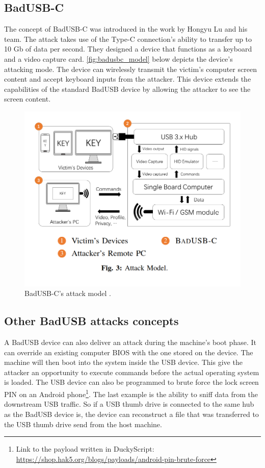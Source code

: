 \subsection*{BadUSB-C}
The concept of BadUSB-C was introduced in the work by Hongyu Lu and his team\cite{badusbc}. The attack takes use of the Type-C connection's ability to transfer up to 10 Gb of data per second. They designed a device that functions as a keyboard and a video capture card. \autoref{fig:badusbc_model} below depicts the device's attacking mode. The device can wirelessly transmit the victim's computer screen content and accept keyboard inputs from the attacker. This device extends the capabilities of the standard BadUSB device by allowing the attacker to see the screen content.
\begin{figure}[ht]
    \centering
    \includegraphics[width=0.7\linewidth]{obrazky-figures/badusbc_attack.png}
    \caption{BadUSB-C's attack model \cite{badusbc}.}
    \label{fig:badusbc_model}
\end{figure}

\subsection*{Other BadUSB attacks concepts}
A BadUSB device can also deliver an attack during the machine's boot phase. It can override an existing computer BIOS with the one stored on the device. The machine will then boot into the system inside the USB device. This give the attacker an opportunity to execute commands before the actual operating system is loaded. The USB device can also be programmed to brute force the lock screen PIN on an Android phone\footnote{Link to the payload written in DuckyScript: \url{https://shop.hak5.org/blogs/payloads/android-pin-brute-force}}. The last example is the ability to sniff data from the downstream USB traffic. So if a USB thumb drive is connected to the same hub as the BadUSB device is, the device can reconstruct a file that was transferred to the USB thumb drive send from the host machine.

